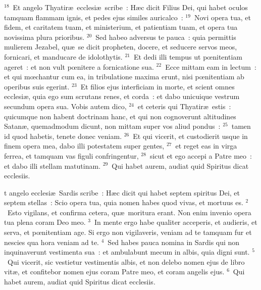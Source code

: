 ${}^{18}$~Et angelo Thyatir\ae\ ecclesi\ae\ scribe~: H\ae c dicit Filius Dei, qui habet oculos tamquam flammam ignis, et pedes ejus similes auricalco~:
${}^{19}$~Novi opera tua, et fidem, et caritatem tuam, et ministerium, et patientiam tuam, et opera tua novissima plura prioribus.
${}^{20}$~Sed habeo adversus te pauca~: quia permittis mulierem Jezabel, qu\ae\ se dicit propheten, docere, et seducere servos meos, fornicari, et manducare de idolothytis.
${}^{21}$~Et dedi illi tempus ut pœnitentiam ageret~: et non vult pœnitere a fornicatione sua.
${}^{22}$~Ecce mittam eam in lectum~: et qui mœchantur cum ea, in tribulatione maxima erunt, nisi pœnitentiam ab operibus suis egerint.
${}^{23}$~Et filios ejus interficiam in morte, et scient omnes ecclesi\ae , quia ego sum scrutans renes, et corda~: et dabo unicuique vestrum secundum opera sua. Vobis autem dico,
${}^{24}$~et ceteris qui Thyatir\ae\ estis~: quicumque non habent doctrinam hanc, et qui non cognoverunt altitudines Satan\ae , quemadmodum dicunt, non mittam super vos aliud pondus~:
${}^{25}$~tamen id quod habetis, tenete donec veniam.
${}^{26}$~Et qui vicerit, et custodierit usque in finem opera mea, dabo illi potestatem super gentes,
${}^{27}$~et reget eas in virga ferrea, et tamquam vas figuli confringentur,
${}^{28}$~sicut et ego accepi a Patre meo~: et dabo illi stellam matutinam.
${}^{29}$~Qui habet aurem, audiat quid Spiritus dicat ecclesiis.

\bchapter
{}t angelo ecclesi\ae\ Sardis scribe~: H\ae c dicit qui habet septem spiritus Dei, et septem stellas~: Scio opera tua, quia nomen habes quod vivas, et mortuus es.
${}^{2}$~Esto vigilans, et confirma cetera, qu\ae\ moritura erant. Non enim invenio opera tua plena coram Deo meo.
${}^{3}$~In mente ergo habe qualiter acceperis, et audieris, et serva, et pœnitentiam age. Si ergo non vigilaveris, veniam ad te tamquam fur et nescies qua hora veniam ad te.
${}^{4}$~Sed habes pauca nomina in Sardis qui non inquinaverunt vestimenta sua~: et ambulabunt mecum in albis, quia digni sunt.
${}^{5}$~Qui vicerit, sic vestietur vestimentis albis, et non delebo nomen ejus de libro vit\ae , et confitebor nomen ejus coram Patre meo, et coram angelis ejus.
${}^{6}$~Qui habet aurem, audiat quid Spiritus dicat ecclesiis.


